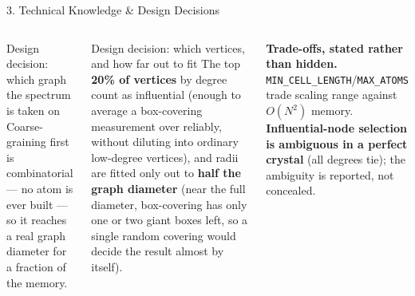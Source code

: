 \documentclass[aspectratio=169, 11pt]{beamer}
\begin{document}
\begin{frame}{3. Technical Knowledge \& Design Decisions}
\begin{columns}[T]
\begin{block}{\footnotesize Design decision: which graph the spectrum is taken on}
{Coarse-graining first is combinatorial --- no atom is ever built --- so it reaches a real
graph diameter for a fraction of the memory.}
\end{block}

\begin{block}{\footnotesize Design decision: which vertices, and how far out to fit}
\scriptsize
The top \textbf{20\% of vertices} by degree count as influential (enough to average a
box-covering measurement over reliably, without diluting into ordinary low-degree
vertices), and radii are fitted only out to \textbf{half the graph diameter} (near the full
diameter, box-covering has only one or two giant boxes left, so a single random covering
would decide the result almost by itself).
\end{block}

{\tiny
\textbf{Trade-offs, stated rather than hidden.} \texttt{MIN\_CELL\_LENGTH}/\texttt{MAX\_ATOMS}
trade scaling range against $O(N^2)$ memory. \textbf{Influential-node selection is ambiguous
in a perfect crystal} (all degrees tie); the ambiguity is reported, not concealed.}
\end{columns}
\end{frame}
\end{document}
